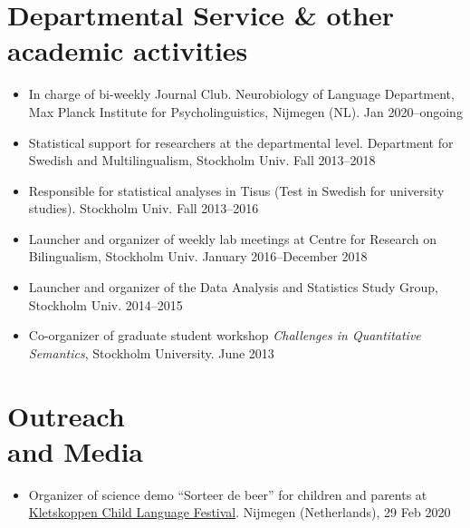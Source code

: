 \documentclass[margin, 11pt]{res} %
\begin{document}
\begin{resume}
\section{\sc Departmental Service \& other academic activities}

\begin{itemize}

\item In charge of bi-weekly Journal Club. Neurobiology of Language Department, Max Planck Institute for Psycholinguistics, Nijmegen (NL). Jan 2020--ongoing

\item Statistical support for researchers at the departmental level. Department for Swedish and Multilingualism, Stockholm Univ.
Fall 2013--2018

\item Responsible for statistical analyses in Tisus (Test in Swedish for university studies). Stockholm Univ. Fall 2013--2016

\item Launcher and organizer of weekly lab meetings at Centre for Research on Bilingualism, Stockholm Univ. January 2016--December 2018

\item Launcher and organizer of the Data Analysis and Statistics Study Group, Stockholm Univ. 2014--2015

\item Co-organizer of graduate student workshop \emph{Challenges in Quantitative Semantics}, Stockholm University. June 2013

\end{itemize}



\section{\sc Outreach \\and Media}

\begin{itemize}

\item Organizer of science demo ``Sorteer de beer'' for children and parents at \href{http://www.kletskoppenfestival.nl/}{Kletskoppen Child Language Festival}. Nijmegen (Netherlands), 29 Feb 2020


\end{itemize}
\end{resume}
\end{document}
